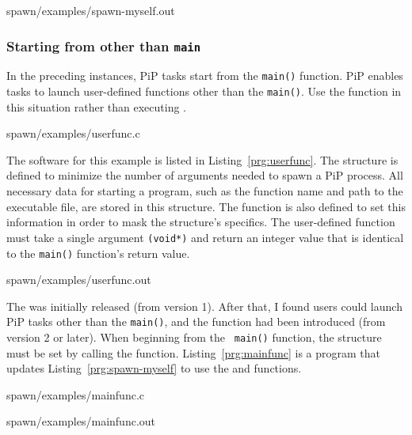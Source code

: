 
                {spawn/examples/spawn-myself.out}

\subsubsection{Starting from other than {\tt main}}\label{sec:spawn-func}

In the preceding instances, PiP tasks start from the {\tt main()}
function. PiP enables tasks to launch user-defined functions other
than the {\tt main()}. Use the  function in this
situation rather than executing . 

 {spawn/examples/userfunc.c}

The software for this example is listed in
Listing~\ref{prg:userfunc}. The 
structure is defined to minimize the number of arguments 
needed to spawn a PiP process. All necessary data for starting a
program, such as the function name and path to the executable file,
are stored in this structure. The 
function is also defined to set this information in order to mask the
structure's specifics. The user-defined function must take a single
argument {\tt (void*)} and return an integer value that is identical
to the {\tt main()} function's return value.

 {spawn/examples/userfunc.out}

The  was initially released (from version
1). After that, I found users could launch PiP tasks other than the
{\tt main()}, and the  function had been
introduced (from version 2 or later). When beginning from the {\tt
  main()} function, the  structure must
be set by calling the  function.  
Listing~\ref{prg:mainfunc} is a program that updates
Listing~\ref{prg:spawn-myself} to use the 
and  functions.  


                {spawn/examples/mainfunc.c}

 {spawn/examples/mainfunc.out}


